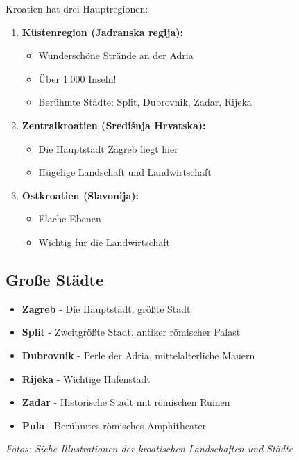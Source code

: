 \begin{culture}
Kroatien hat drei Hauptregionen:

\begin{enumerate}
    \item \textbf{Küstenregion (Jadranska regija):} 
    \begin{itemize}
        \item Wunderschöne Strände an der Adria
        \item Über 1.000 Inseln!
        \item Berühmte Städte: Split, Dubrovnik, Zadar, Rijeka
    \end{itemize}
    
    \item \textbf{Zentralkroatien (Središnja Hrvatska):}
    \begin{itemize}
        \item Die Hauptstadt Zagreb liegt hier
        \item Hügelige Landschaft und Landwirtschaft
    \end{itemize}
    
    \item \textbf{Ostkroatien (Slavonija):}
    \begin{itemize}
        \item Flache Ebenen
        \item Wichtig für die Landwirtschaft
    \end{itemize}
\end{enumerate}

\subsection*{Große Städte}

\begin{itemize}
    \item \textbf{Zagreb} - Die Hauptstadt, größte Stadt
    \item \textbf{Split} - Zweitgrößte Stadt, antiker römischer Palast
    \item \textbf{Dubrovnik} - \glqq Perle der Adria\grqq{}, mittelalterliche Mauern
    \item \textbf{Rijeka} - Wichtige Hafenstadt
    \item \textbf{Zadar} - Historische Stadt mit römischen Ruinen
    \item \textbf{Pula} - Berühmtes römisches Amphitheater
\end{itemize}

\textit{Fotos: Siehe Illustrationen der kroatischen Landschaften und Städte}
\end{culture}

